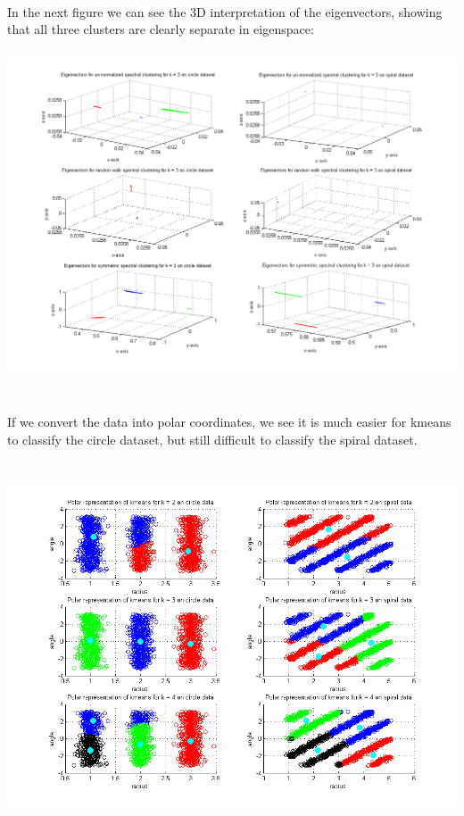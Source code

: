 \documentclass[paper=a4, fontsize=11pt]{scrartcl} %
\numberwithin{equation}{section} %
\numberwithin{figure}{section} %
\numberwithin{table}{section} %
\begin{document}
	\\\\\\
	In the next figure we can see the 3D interpretation of the eigenvectors, showing that all three clusters are clearly separate in eigenspace:
	\\\\
	\hspace*{-4.3cm}\includegraphics[scale=0.55]{3dplots}
	\\\\\\
	If we convert the data into polar coordinates, we see it is much easier for kmeans to classify the circle dataset, but still difficult to classify the spiral dataset.
	\\\\\\
	\hspace*{-3cm}\includegraphics[scale=0.8]{polar_kmeans}
\end{document}
